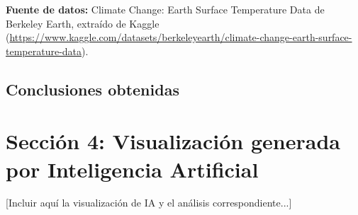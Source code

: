 \documentclass[12pt, a4paper]{article}
\begin{document}
\textbf{Fuente de datos:} Climate Change: Earth Surface Temperature Data de Berkeley Earth, extraído de Kaggle (\url{https://www.kaggle.com/datasets/berkeleyearth/climate-change-earth-surface-temperature-data}).

\subsection{Conclusiones obtenidas}



\newpage
\section{Sección 4: Visualización generada por Inteligencia Artificial}

[Incluir aquí la visualización de IA y el análisis correspondiente...]
\end{document}
